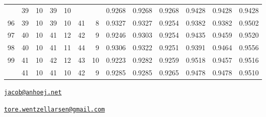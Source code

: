 \begin{Schunk}
\begin{longtable}{rrrrrrrrrrrrr}
\addlinespace
95 & 39 & 10 & 39 & 10 &  &  & 0.9268 & 0.9268 & 0.9268 & 0.9428 & 0.9428 & 0.9428\\
96 & 39 & 10 & 39 & 10 & 41 & 8 & 0.9327 & 0.9327 & 0.9254 & 0.9382 & 0.9382 & 0.9502\\
97 & 40 & 10 & 41 & 12 & 42 & 9 & 0.9246 & 0.9303 & 0.9254 & 0.9435 & 0.9459 & 0.9520\\
98 & 40 & 10 & 41 & 11 & 44 & 9 & 0.9306 & 0.9322 & 0.9251 & 0.9391 & 0.9464 & 0.9556\\
99 & 41 & 10 & 42 & 12 & 43 & 10 & 0.9223 & 0.9282 & 0.9259 & 0.9518 & 0.9457 & 0.9516\\
\addlinespace
100 & 41 & 10 & 41 & 10 & 42 & 9 & 0.9285 & 0.9285 & 0.9265 & 0.9478 & 0.9478 & 0.9510\\*
\end{longtable}

\end{Schunk}


\address{%
Jacob Anhøj\\
Rigshospitalet, University of Copenhagen\\
Denmark\\
}
\href{mailto:jacob@anhoej.net}{\nolinkurl{jacob@anhoej.net}}

\address{%
Tore Wentzel-Larsen\\
Centre for Child and Adolescent Mental Health, Eastern and Southern
Norway \& Centre for Violence and Traumatic Stress Studies, Oslo, Norway\\
Norway\\
}
\href{mailto:tore.wentzellarsen@gmail.com}{\nolinkurl{tore.wentzellarsen@gmail.com}}

